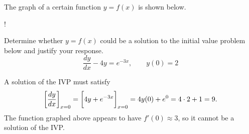 \documentclass[]{ximera}
\begin{document}
\begin{problem}
The graph of a certain function $y=f(x)$ is shown below.

\begin{center}
\resizebox {5.0cm} {!} { }
\end{center}

Determine whether $y=f(x)$ could be a solution to the initial value problem below and justify your response. 
\[
\dfrac{dy}{dx}-4y=e^{-3x} , \qquad y(0)=2
\]

\begin{solution}
A solution of the IVP must satisfy
$$
\bigg[ \frac{dy}{dx} \bigg]_{x=0} = \bigg[ 4y + e^{-3x} \bigg]_{x=0} = 4y(0) + e^0 = 4 \cdot 2 + 1 = 9.
$$
The function graphed above appears to have $f'(0) \approx 3$, so it cannot be a solution of the IVP.
\end{solution}


\end{problem}
\end{document}
